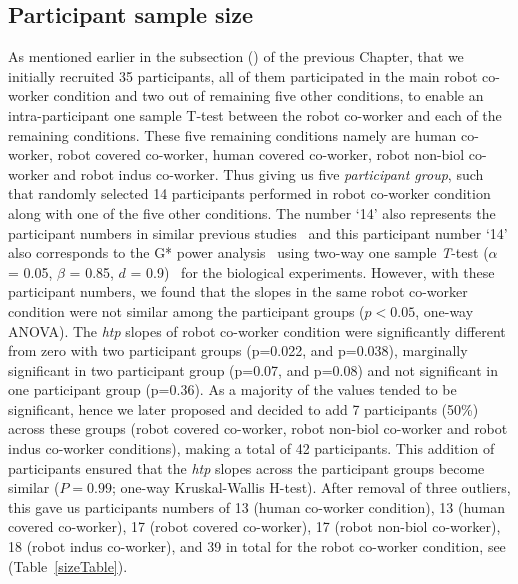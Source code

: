 \subsection{Participant sample size}

As mentioned earlier in the subsection () of the previous Chapter, that we initially recruited 35 participants, all of them participated in the main robot co-worker condition and two out of remaining five other conditions, to enable an intra-participant one sample T-test between the robot co-worker and each of the remaining conditions. These five remaining conditions namely are human co-worker, robot covered co-worker, human covered co-worker, robot non-biol co-worker and robot indus co-worker. Thus giving us five \textit{participant group}, such that randomly selected 14 participants performed in robot co-worker condition along with one of the five other conditions. The number `14' also represents the participant numbers in similar previous studies~\cite{Bisio:PlosOne:2010, Bisio:PlosOne:2014} and this participant number `14' also corresponds to the G* power analysis~\cite{Erdfelder:JBRMIC:1996} using two-way one sample {\it T}-test ($\alpha$ = 0.05, $\beta$ = 0.85, $d$ = 0.9)~\cite{Verma:power_analysis:2017} for the biological experiments. However, with these participant numbers, we found that the slopes in the same robot co-worker condition were not similar among the participant groups ($p<0.05$, one-way ANOVA). The {\it htp} slopes of robot co-worker condition were significantly different from zero with two participant groups (p=0.022, and p=0.038), marginally significant in two participant group (p=0.07, and p=0.08) and not significant in one participant group (p=0.36). As a majority of the values tended to be significant, hence we later proposed and decided to add 7 participants (50\%) across these groups (robot covered co-worker, robot non-biol co-worker and robot indus co-worker conditions), making a total of 42 participants. This addition of participants ensured that the {\it htp} slopes across the participant groups become similar ($P = 0.99$; one-way Kruskal-Wallis H-test). After removal of three outliers, this gave us participants numbers of 13 (human co-worker condition), 13 (human covered co-worker), 17 (robot covered co-worker), 17 (robot non-biol co-worker), 18 (robot indus co-worker), and 39 in total for the robot co-worker condition, see (Table~\ref{sizeTable}).



